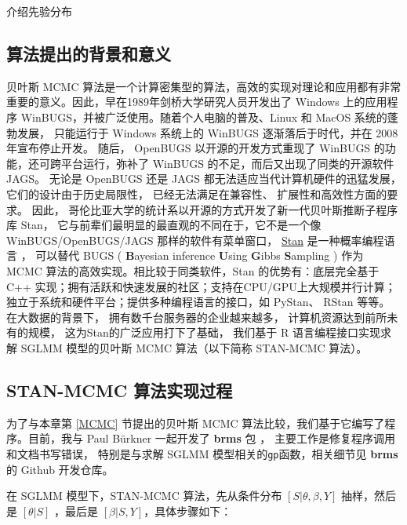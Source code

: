\documentclass[12pt,a4paper,UTF8,twoside]{book}
\theoremstyle{definition}
\theoremstyle{definition}
\theoremstyle{definition}
\theoremstyle{remark}
\begin{document}
介绍先验分布 \citep{SAS2017}

\subsection{算法提出的背景和意义}

贝叶斯 MCMC
算法是一个计算密集型的算法，高效的实现对理论和应用都有非常重要的意义。因此，早在1989年剑桥大学研究人员开发出了
Windows 上的应用程序 WinBUGS，并被广泛使用。随着个人电脑的普及、Linux 和
MacOS 系统的蓬勃发展， 只能运行于 Windows 系统上的 WinBUGS
逐渐落后于时代，并在 2008 年宣布停止开发。 随后， OpenBUGS
以开源的开发方式重现了 WinBUGS 的功能，还可跨平台运行，弥补了 WinBUGS
的不足，而后又出现了同类的开源软件 JAGS。 无论是 OpenBUGS 还是 JAGS
都无法适应当代计算机硬件的迅猛发展， 它们的设计由于历史局限性，
已经无法满足在兼容性、 扩展性和高效性方面的要求。 因此，
哥伦比亚大学的统计系以开源的方式开发了新一代贝叶斯推断子程序库 Stan，
它与前辈们最明显的最直观的不同在于，它不是一个像 WinBUGS/OpenBUGS/JAGS
那样的软件有菜单窗口， \href{http://mc-stan.org/}{Stan}
是一种概率编程语言 \citep{Stan2017JSS}， 可以替代 BUGS (
\textbf{B}ayesian inference \textbf{U}sing \textbf{G}ibbs
\textbf{S}ampling ) \citep{BUGS2009} 作为 MCMC
算法的高效实现。相比较于同类软件，Stan 的优势有：底层完全基于 C++
实现；拥有活跃和快速发展的社区；支持在CPU/GPU上大规模并行计算；独立于系统和硬件平台；提供多种编程语言的接口，如
PyStan、 RStan 等等。 在大数据的背景下，
拥有数千台服务器的企业越来越多， 计算机资源达到前所未有的规模，
这为Stan的广泛应用打下了基础， 我们基于 R 语言编程接口实现求解 SGLMM
模型的贝叶斯 MCMC 算法（以下简称 STAN-MCMC 算法）。

\hypertarget{STANMCMC}{%
\subsection{STAN-MCMC 算法实现过程}\label{STANMCMC}}

为了与本章第 \ref{MCMC} 节提出的贝叶斯 MCMC
算法比较，我们基于它编写了程序。目前，我与 Paul Bürkner 一起开发了
\textbf{brms} 包 \citep{brms2017JSS}，
主要工作是修复程序调用和文档书写错误， 特别是与求解 SGLMM
模型相关的\texttt{gp}函数，相关细节见 \textbf{brms} 的 Github 开发仓库。

在 SGLMM 模型下，STAN-MCMC 算法，先从条件分布 \([S|\theta,\beta,Y]\)
抽样，然后是 \([\theta|S]\) ，最后是 \([\beta|S,Y]\)，具体步骤如下：
\end{document}
